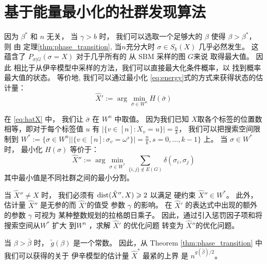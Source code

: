 \section{基于能量最小化的社群发现算法}\label{sec:em}
因为 $\beta^*$ 和 $n$ 无关，
当 $\gamma>b$ 时，
我们可以选取一个足够大的 $\beta$ 使得
$\beta > \beta^*$，
则 由 定理\ref{thm:phase_transition}, 当$n$充分大时 $\sigma \in S_k(X)$ 几乎必然发生。
这蕴含了 $P_{\sigma | G}(\sigma = X)$
对于几乎所有的 从 SBM 采样的图  $G$来说 取得最大值。
因此
相比于从伊辛模型中采样的方法，我们可以直接最大化条件概率，以
找到概率最大值的状态。
等价地, 我们可以通过最小化 \eqref{eq:energy}式的方式来获得状态的估计量：
\begin{equation}\label{eq:hatX}
\hat{X}' := \arg\min_{\bar{\sigma} \in W^n} H(\bar{\sigma})
\end{equation}

在 \eqref{eq:hatX} 中， 我们让 $\bar{\sigma}$ 在 $W^n$ 中取值。
因为我们已知 $X$取各个标签的位置数相等，即对于每个标签值 $u$
有 $|\{v \in [n] : X_v = u\}| = \frac{n}{k}$，
我们可以把搜索空间限制到
$W^*:= \{\sigma\in W^n \big\vert |\{v \in [n] : \sigma_v = \omega^s\}| = \frac{n}{k}, s=0,\dots, k-1 \}$
上。
当 $\sigma \in W^*$ 时， 最小化 $H(\sigma)$ 等价于：
\begin{equation}\label{eq:hatX_double_prime}
\hat{X}'' := \arg\min_{\sigma \in W^*} \sum_{\{i,j\} \not\in E(G) } \delta(\sigma_i, \sigma_j)
\end{equation}
其中最小值是不同社群之间的最小分割。

当 $\hat{X}'' \neq X$ 时，
我们必须有  $\operatorname{dist}(\hat{X}'' ,X)\geqslant 2$
以满足 硬约束 $\hat{X}'' \in W^*$。
此外，估计量 $\hat{X}''$ 是无参的而 $\hat{X}'$的值受
参数 $\gamma$ 的影响。
在
$\hat{X}'$ 的表达式中出现的额外的参数 $\gamma$ 可视为
某种整数规划的拉格朗日乘子。
因此，通过引入惩罚因子项和将搜索空间从$W^*$ 扩大 到$W^n$
，求解 $\hat{X}'$
的优化问题 转变为 $\hat{X}''$的优化问题。

当 $\beta > \bar{\beta}$ 时，
$\tilde{g}(\beta)$ 是一个常数。
因此，从 Theorem \ref{thm:phase_transition} 中我们可以获得的关于
伊辛模型的估计量 $\hat{X}^*$ 最紧的上界
是  $n^{g(\bar{\beta})/2}$。

